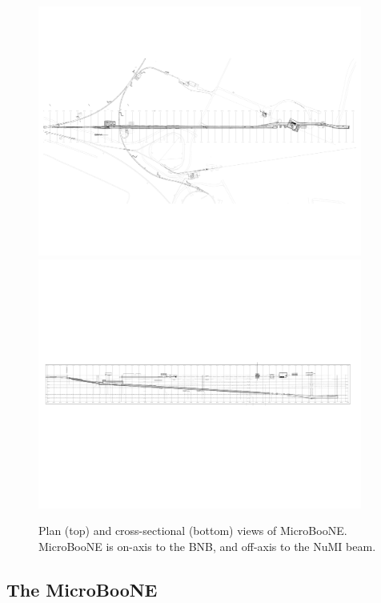\begin{figure}
\centering 
\includegraphics[width=0.95\textwidth]{figures/current_long_plot-PLAN.pdf}
\includegraphics[width=0.95\textwidth]{figures/current_long_plot-SECTION.pdf}
\caption{Plan (top) and cross-sectional (bottom) views of MicroBooNE.  MicroBooNE is on-axis to the BNB, and off-axis to the NuMI beam.}
\label{fnalmap}
\end{figure}


\subsection{The MicroBooNE \lartpc}

